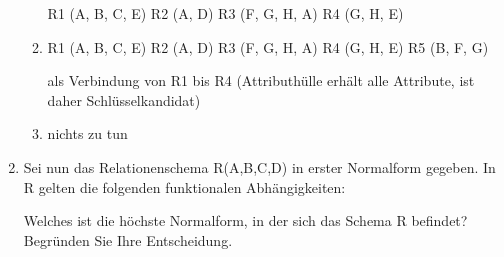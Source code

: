 \documentclass{lehramt-informatik-aufgabe}
\begin{document}
\begin{enumerate}
\begin{liAntwort}
\begin{enumerate}
R1 (A, B, C, E)
R2 (A, D)
R3 (F, G, H, A)
R4 (G, H, E)

\item {}

R1 (A, B, C, E)
R2 (A, D)
R3 (F, G, H, A)
R4 (G, H, E)
R5 (B, F, G)

als Verbindung von R1 bis R4
(Attributhülle erhält alle Attribute, ist daher Schlüsselkandidat)
\item {}

nichts zu tun
\end{enumerate}
\end{liAntwort}


\item Sei nun das Relationenschema R(A,B,C,D) in erster Normalform
gegeben. In R gelten die folgenden funktionalen Abhängigkeiten:


Welches ist die höchste Normalform, in der sich das Schema R befindet?
Begründen Sie Ihre Entscheidung.

\end{enumerate}
\end{document}
